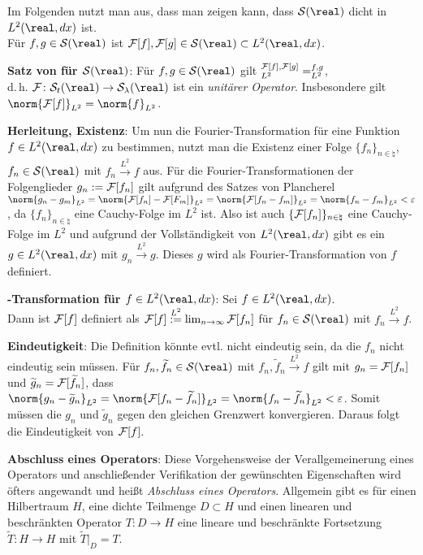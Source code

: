 Im Folgenden nutzt man aus, dass man zeigen kann, dass
$\S(\real)$ dicht in $L^2(\real, dx)$ ist.\\
Für $f, g \in \S(\real)$ ist
$\F[f], \F[g] \in \S(\real) \subset L^2(\real, dx)$.

\textbf{Satz von  für $\S(\real)$}:
Für $f, g \in \S(\real)$ gilt
$\sp{\ensuremath{\mathcal{F}}[f], \ensuremath{\mathcal{F}}[g]}_{L^2} = \sp{f, g}_{L^2}$,\\
d.\,h. $\F\colon \S_t(\real) \rightarrow \S_\lambda(\real)$ ist ein
\emph{unitärer Operator}.
Insbesondere gilt $\norm{\F[f]}_{L^2} = \norm{f}_{L^2}$.

\linie

\textbf{Herleitung, Existenz}:
Um nun die Fourier-Transformation für eine Funktion $f \in L^2(\real, dx)$ zu
bestimmen, nutzt man die Existenz einer Folge $\{f_n\}_{n \in \natural}$,
$f_n \in \S(\real)$ mit $f_n \xrightarrow{L^2} f$
aus.
Für die Fourier-Transformationen der Folgenglieder
$g_n := \mathcal{F}[f_n]$ gilt aufgrund des Satzes von Plancherel
$\norm{g_n - g_m}_{L^2} = \norm{\F[f_n] - \F[F_m]}_{L^2} =
\norm{\F[f_n - f_m]}_{L^2} = \norm{f_n - f_m}_{L^2} < \varepsilon$,
da $\{f_n\}_{n \in \natural}$ eine Cauchy-Folge im $L^2$ ist.
Also ist auch $\{\mathcal{F}[f_n]\}_{n \in \natural}$ eine Cauchy-Folge im $L^2$ und
aufgrund der Vollständigkeit von $L^2(\real, dx)$ gibt es ein
$g \in L^2(\real, dx)$ mit $g_n \xrightarrow{L^2} g$.
Dieses $g$ wird als Fourier-Transformation von $f$ definiert.

\textbf{-Transformation für $f \in L^2(\real, dx)$}:
Sei $f \in L^2(\real, dx)$.\\
Dann ist $\mathcal{F}[f]$ definiert als
$\mathcal{F}[f] \overset{L^2}{:=} \lim_{n \to \infty} \mathcal{F}[f_n]$
für $f_n \in \S(\real)$ mit $f_n \xrightarrow{L^2} f$.

\textbf{Eindeutigkeit}:
Die Definition könnte evtl. nicht eindeutig sein, da die $f_n$ nicht eindeutig
sein müssen.
Für $f_n, \widetilde{f}_n \in \S(\real)$ mit
$f_n, \widetilde{f}_n \xrightarrow{L^2} f$ gilt
mit $g_n = \mathcal{F}[f_n]$ und $\widetilde{g}_n = \mathcal{F}[\widetilde{f}_n]$, dass
$\norm{g_n - \widetilde{g}_n}_{L^2} = \norm{\F[f_n - \widetilde{f}_n]}_{L^2} =
\norm{f_n - \widetilde{f}_n}_{L^2} < \varepsilon$.
Somit müssen die $g_n$ und $\widetilde{g}_n$ gegen den gleichen Grenzwert
konvergieren.
Daraus folgt die Eindeutigkeit von $\mathcal{F}[f]$.

\textbf{Abschluss eines Operators}:
Diese Vorgehensweise der Verallgemeinerung eines Operators und anschließender
Verifikation der gewünschten Eigenschaften wird öfters angewandt und heißt
\emph{Abschluss eines Operators}.
Allgemein gibt es für einen Hilbertraum $H$, eine dichte Teilmenge
$D \subset H$ und einen linearen und beschränkten Operator
$T\colon D \rightarrow H$ eine lineare und beschränkte Fortsetzung
$\widetilde{T}\colon H \rightarrow H$ mit $\widetilde{T}|_D = T$.

